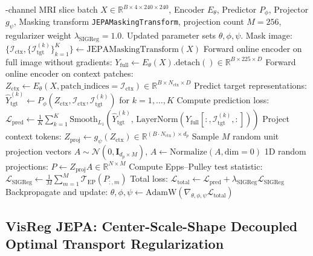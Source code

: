 \documentclass{article}
\begin{document}
\begin{algorithm}[H]
\caption{Self-Supervised Pre-Training of SigReg JEPA (LeJEPA)}
\label{alg:sigreg_jepa}
\begin{algorithmic}[1]
-channel MRI slice batch $X \in \mathbb{R}^{B \times 4 \times 240 \times 240}$, Encoder $E_\theta$, Predictor $P_\phi$, Projector $g_\psi$, Masking transform \texttt{JEPAMaskingTransform}, projection count $M=256$, regularizer weight $\lambda_{\text{SIGReg}} = 1.0$.
\Ensure Updated parameter sets $\theta, \phi, \psi$.
\State Mask image: $\{\mathcal{I}_{\text{ctx}}, \{\mathcal{I}_{\text{tgt}}^{(k)}\}_{k=1}^K\} \leftarrow \text{JEPAMaskingTransform}(X)$
\State Forward online encoder on full image without gradients:
\State \quad $Y_{\text{full}} \leftarrow E_\theta(X).\text{detach}() \in \mathbb{R}^{B \times 225 \times D}$ 
\State Forward online encoder on context patches:
\State \quad $Z_{\text{ctx}} \leftarrow E_\theta(X, \text{patch\_indices}=\mathcal{I}_{\text{ctx}}) \in \mathbb{R}^{B \times N_{\text{ctx}} \times D}$
\State Predict target representations:
\State \quad $\hat{Y}_{\text{tgt}}^{(k)} \leftarrow P_\phi(Z_{\text{ctx}}, \mathcal{I}_{\text{ctx}}, \mathcal{I}_{\text{tgt}}^{(k)})$ for $k = 1, \dots, K$
\State Compute prediction loss: $\mathcal{L}_{\text{pred}} \leftarrow \frac{1}{K} \sum_{k=1}^K \text{Smooth}_{L_1}\left(\hat{Y}_{\text{tgt}}^{(k)}, \, \text{LayerNorm}(Y_{\text{full}}[:, \mathcal{I}_{\text{tgt}}^{(k)}, :])\right)$
\State Project context tokens: $Z_{\text{proj}} \leftarrow g_\psi(Z_{\text{ctx}}) \in \mathbb{R}^{(B \cdot N_{\text{ctx}}) \times d_p}$
\State Sample $M$ random unit projection vectors $A \sim \mathcal{N}(0, \mathbf{I}_{d_p \times M})$, $A \leftarrow \text{Normalize}(A, \text{dim}=0)$
\State 1D random projections: $P \leftarrow Z_{\text{proj}} A \in \mathbb{R}^{N \times M}$
\State Compute Epps--Pulley test statistic: $\mathcal{L}_{\text{SIGReg}} \leftarrow \frac{1}{M} \sum_{m=1}^M \mathcal{T}_{\text{EP}}(P_{:, m})$
\State Total loss: $\mathcal{L}_{\text{total}} \leftarrow \mathcal{L}_{\text{pred}} + \lambda_{\text{SIGReg}} \mathcal{L}_{\text{SIGReg}}$
\State Backpropagate and update: $\theta, \phi, \psi \leftarrow \text{AdamW}(\nabla_{\theta, \phi, \psi} \mathcal{L}_{\text{total}})$
\end{algorithmic}
\end{algorithm}

\subsection{VisReg JEPA: Center-Scale-Shape Decoupled Optimal Transport Regularization}
\end{document}
